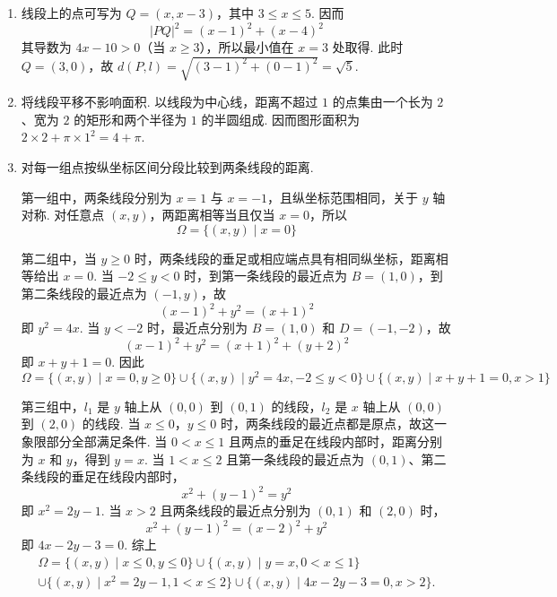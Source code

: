 \begin{solution}
\begin{enumerate}
\item 线段上的点可写为 \(Q=(x,x-3)\)，其中 \(3\leqslant x\leqslant5\). 因而
\[
|PQ|^2=(x-1)^2+(x-4)^2
\]
其导数为 \(4x-10>0\)（当 \(x\geqslant3\)），所以最小值在 \(x=3\) 处取得. 此时 \(Q=(3,0)\)，故 \(d(P,l)=\sqrt{(3-1)^2+(0-1)^2}=\sqrt5\).
\item 将线段平移不影响面积. 以线段为中心线，距离不超过 \(1\) 的点集由一个长为 \(2\)、宽为 \(2\) 的矩形和两个半径为 \(1\) 的半圆组成. 因而图形面积为 \(2\times2+\pi\times1^2=4+\pi\).
\item 对每一组点按纵坐标区间分段比较到两条线段的距离.

第一组中，两条线段分别为 \(x=1\) 与 \(x=-1\)，且纵坐标范围相同，关于 \(y\) 轴对称. 对任意点 \((x,y)\)，两距离相等当且仅当 \(x=0\)，所以
\[
\Omega=\{(x,y)\mid x=0\}
\]

第二组中，当 \(y\geqslant0\) 时，两条线段的垂足或相应端点具有相同纵坐标，距离相等给出 \(x=0\). 当 \(-2\leqslant y<0\) 时，到第一条线段的最近点为 \(B=(1,0)\)，到第二条线段的最近点为 \((-1,y)\)，故
\[
(x-1)^2+y^2=(x+1)^2
\]
即 \(y^2=4x\). 当 \(y<-2\) 时，最近点分别为 \(B=(1,0)\) 和 \(D=(-1,-2)\)，故
\[
(x-1)^2+y^2=(x+1)^2+(y+2)^2
\]
即 \(x+y+1=0\). 因此
\[
\Omega=\{(x,y)\mid x=0, y\geqslant0\}\cup\{(x,y)\mid y^2=4x, -2\leqslant y<0\}\cup\{(x,y)\mid x+y+1=0, x>1\}
\]

第三组中，\(l_1\) 是 \(y\) 轴上从 \((0,0)\) 到 \((0,1)\) 的线段，\(l_2\) 是 \(x\) 轴上从 \((0,0)\) 到 \((2,0)\) 的线段. 当 \(x\leqslant0\)，\(y\leqslant0\) 时，两条线段的最近点都是原点，故这一象限部分全部满足条件. 当 \(0<x\leqslant1\) 且两点的垂足在线段内部时，距离分别为 \(x\) 和 \(y\)，得到 \(y=x\). 当 \(1<x\leqslant2\) 且第一条线段的最近点为 \((0,1)\)、第二条线段的垂足在线段内部时，
\[
x^2+(y-1)^2=y^2
\]
即 \(x^2=2y-1\). 当 \(x>2\) 且两条线段的最近点分别为 \((0,1)\) 和 \((2,0)\) 时，
\[
x^2+(y-1)^2=(x-2)^2+y^2
\]
即 \(4x-2y-3=0\). 综上
\[
\begin{gathered}
\Omega=\{(x,y)\mid x\leqslant0, y\leqslant0\}\cup\{(x,y)\mid y=x, 0<x\leqslant1\}\\
\cup\{(x,y)\mid x^2=2y-1, 1<x\leqslant2\}\cup\{(x,y)\mid 4x-2y-3=0, x>2\}.
\end{gathered}
\]
\end{enumerate}
\end{solution}
